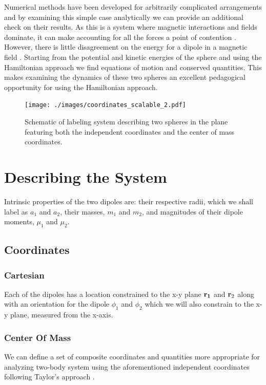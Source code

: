 \documentclass[prbg,preprint]{revtex4-1}
\newcommand{\cvec}[1]{{\rm{\bf{#1}}}}
\begin{document}
Numerical methods have been developed for arbitrarily complicated arrangements \cite{Furlani:1995aa} and by examining this simple case analytically we can provide an additional check on their results.
As this is a system where magnetic interactions and fields dominate, it can make accounting for all the forces a point of contention\cite{Boyer:1988aa} \cite{Vaidman:1990aa} \cite{Griffiths:1992aa} \cite{Brownstein:1993aa}  \cite{Hnizdo:1997aa}.
However, there is little disagreement on the energy for a dipole in a magnetic field \cite{Greene:1971aa} \cite{Griffiths:1992aa}. 
Starting from the potential and kinetic energies of the sphere and using the Hamiltonian approach we find equations of motion and conserved quantities.
This makes examining the dynamics of these two spheres an excellent pedagogical opportunity for using the Hamiltonian approach.


\begin{figure}[h]
  \centering
  \texttt{[image: ./images/coordinates\_scalable\_2.pdf]}
  \caption{Schematic of labeling system describing two spheres in the plane featuring both the independent coordinates and the center of mass coordinates.}
\end{figure}


\section{Describing the System}
Intrinsic properties of the two dipoles are: their respective radii, which we shall label as $a_1$ and $a_2$, their masses, $m_1$ and $m_2$, and magnitudes of their dipole moments, $\mu_1$ and $\mu_2$.
\subsection{Coordinates}
\subsubsection{Cartesian}

Each of the dipoles has a location constrained to the x-y plane $\cvec{r_1}$ and $\cvec r_2$ along with an orientation for the dipole $\phi_1$ and $\phi_2$ which we will also constrain to the x-y plane, measured from the x-axis.
\subsubsection{Center Of Mass}
We can define a set of composite coordinates and quantities more appropriate for analyzing two-body system using the aforementioned independent coordinates following Taylor's approach \cite{taylor2005classical}. 
\end{document}
